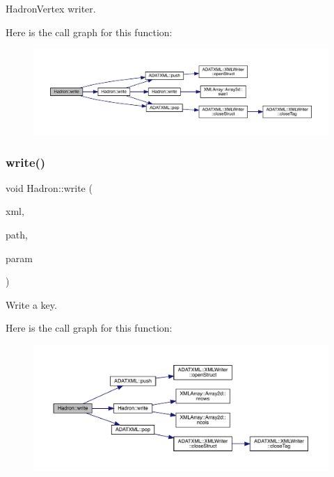 Hadron\+Vertex writer. 

Here is the call graph for this function\+:
\nopagebreak
\begin{figure}[H]
\begin{center}
\leavevmode
\includegraphics[width=350pt]{d1/daf/namespaceHadron_a9309edc67ae704a831f01ae854c5bf12_cgraph}
\end{center}
\end{figure}
\mbox{\label{namespaceHadron_a9d260315c8fc49d172ff22fd3abb49c9}} 
\subsubsection{\texorpdfstring{write()}{write()}\hspace{0.1cm}{\footnotesize\ttfamily [50/95]}}
{\footnotesize\ttfamily void Hadron\+::write (\begin{DoxyParamCaption}\item[{\mbox{\hyperlink{classADATXML_1_1XMLWriter}{X\+M\+L\+Writer}} \&}]{xml,  }\item[{const std\+::string \&}]{path,  }\item[{const \mbox{\hyperlink{structHadron_1_1KeyPeramDist__t}{Key\+Peram\+Dist\+\_\+t}} \&}]{param }\end{DoxyParamCaption})}



Write a key. 

Here is the call graph for this function\+:
\nopagebreak
\begin{figure}[H]
\begin{center}
\leavevmode
\includegraphics[width=350pt]{d1/daf/namespaceHadron_a9d260315c8fc49d172ff22fd3abb49c9_cgraph}
\end{center}
\end{figure}
\mbox{\label{namespaceHadron_a12ff79f44bd22acfe6be486d4089262e}} 
